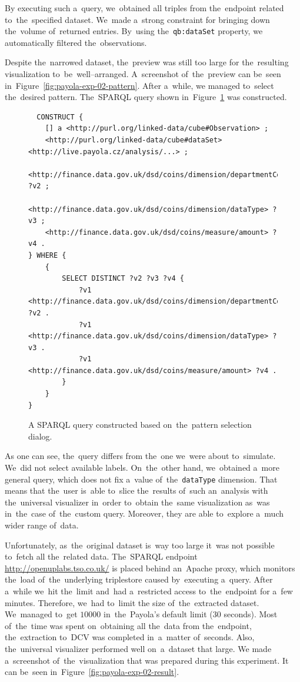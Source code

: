 By executing such a~query, we~obtained all triples from the~endpoint 
related to~the~specified dataset. We~made a~strong constraint for bringing 
down the~volume of~returned entries. By~using the~\texttt{qb:dataSet} property, 
we automatically filtered the~observations.

Despite the~narrowed dataset, the~preview was still too large 
for the~resulting visualization to~be~well--arranged. A~screenshot of~the~preview can be~seen in~Figure~\ref{fig:payola-exp-02-pattern}. After a~while,
we managed to~select the~desired 
pattern. The~SPARQL query shown in~Figure~\ref{fig:coins-pattern-result} was 
constructed.

\begin{figure}
  \scriptsize
\begin{verbatim}
  CONSTRUCT {
    [] a <http://purl.org/linked-data/cube#Observation> ;
    <http://purl.org/linked-data/cube#dataSet> <http://live.payola.cz/analysis/...> ;
    <http://finance.data.gov.uk/dsd/coins/dimension/departmentCode> ?v2 ;
    <http://finance.data.gov.uk/dsd/coins/dimension/dataType> ?v3 ;
    <http://finance.data.gov.uk/dsd/coins/measure/amount> ?v4 .
} WHERE {
    {
        SELECT DISTINCT ?v2 ?v3 ?v4 {
            ?v1 <http://finance.data.gov.uk/dsd/coins/dimension/departmentCode> ?v2 .
            ?v1 <http://finance.data.gov.uk/dsd/coins/dimension/dataType> ?v3 .
            ?v1 <http://finance.data.gov.uk/dsd/coins/measure/amount> ?v4 .
        }
    }
} 
\end{verbatim}
\caption{A SPARQL query constructed based on~the~pattern selection dialog.}
\label{fig:coins-pattern-result}
\end{figure}

As one can see, the~query differs from the~one we~were about to~simulate. We~did not select available labels. On~the~other hand, we~obtained a~more general 
query, which does not fix a~value of~the~\texttt{dataType} dimension. That means 
that the~user is~able to~slice the~results of~such an~analysis with the~universal 
visualizer in~order to~obtain the~same visualization as~was in~the~case of~the~custom 
query. Moreover, they are able to~explore a~much wider range of~data.  

\begin{sloppypar}
Unfortunately, as~the~original dataset is~way too large it~was not possible to~fetch all the~related data. The~SPARQL endpoint \mbox{\url{http://openuplabs.tso.co.uk/}}
is placed behind an~Apache proxy, which monitors the~load of~the~underlying 
triplestore caused by~executing a~query. After a~while we~hit the~limit and~had a~restricted access to~the~endpoint for a~few minutes. Therefore, we~had to~limit 
the size of~the~extracted dataset. We~managed to~get $10000$ in~the~Payola's 
default limit (30 seconds). Most of~the~time was spent on~obtaining all the~data from the~endpoint, the~extraction to~DCV was completed in~a~matter of~seconds. Also, the~universal visualizer performed well on~a~dataset that large.
We made a~screenshot of~the~visualization that was prepared during this experiment.
It can be~seen in~Figure~\ref{fig:payola-exp-02-result}.
\end{sloppypar}

